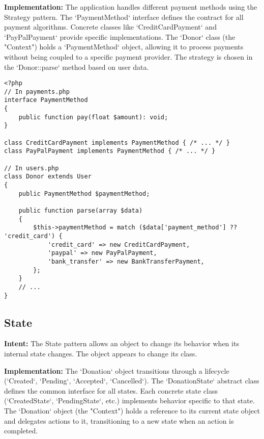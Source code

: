 \documentclass[11pt,a4paper]{article}
\begin{document}
\textbf{Implementation:} The application handles different payment methods using the Strategy pattern. The `PaymentMethod` interface defines the contract for all payment algorithms. Concrete classes like `CreditCardPayment` and `PayPalPayment` provide specific implementations. The `Donor` class (the "Context") holds a `PaymentMethod` object, allowing it to process payments without being coupled to a specific payment provider. The strategy is chosen in the `Donor::parse` method based on user data.

\begin{lstlisting}[caption={The Strategy interface and its context.}, label={lst:strategy}]
% Filepath: src\models\payments.php & src\models\users.php
<?php
// In payments.php
interface PaymentMethod
{
	public function pay(float $amount): void;
}

class CreditCardPayment implements PaymentMethod { /* ... */ }
class PayPalPayment implements PaymentMethod { /* ... */ }

// In users.php
class Donor extends User
{
	public PaymentMethod $paymentMethod;

	public function parse(array $data)
	{
		$this->paymentMethod = match ($data['payment_method'] ?? 'credit_card') {
			'credit_card' => new CreditCardPayment,
			'paypal' => new PayPalPayment,
			'bank_transfer' => new BankTransferPayment,
		};
	}
    // ...
}
\end{lstlisting}

\subsection{State}
\textbf{Intent:} The State pattern allows an object to change its behavior when its internal state changes. The object appears to change its class.

\textbf{Implementation:} The `Donation` object transitions through a lifecycle (`Created`, `Pending`, `Accepted`, `Cancelled`). The `DonationState` abstract class defines the common interface for all states. Each concrete state class (`CreatedState`, `PendingState`, etc.) implements behavior specific to that state. The `Donation` object (the "Context") holds a reference to its current state object and delegates actions to it, transitioning to a new state when an action is completed.
\end{document}
